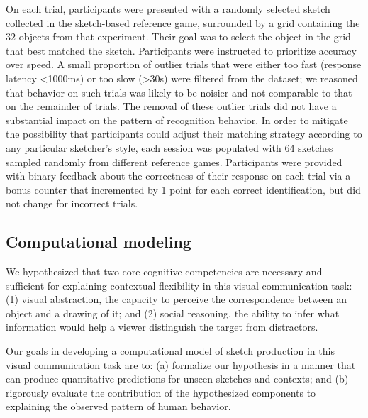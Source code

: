 \documentclass[9pt,twocolumn,twoside]{pnas-new}
\begin{document}
{On each trial, participants were presented with a randomly selected sketch collected in the sketch-based reference game, surrounded by a grid containing the 32 objects from that experiment. Their goal was to select the object in the grid that best matched the sketch. Participants were instructed to prioritize accuracy over speed. A small proportion of outlier trials that were either too fast (response latency <1000ms) or too slow (>30s) were filtered from the dataset; we reasoned that behavior on such trials was likely to be noisier and not comparable to that on the remainder of trials. The removal of these outlier trials did not have a substantial impact on the pattern of recognition behavior. In order to mitigate the possibility that participants could adjust their matching strategy according to any particular sketcher's style, each session was populated with 64 sketches sampled randomly from different reference games. Participants were provided with binary feedback about the correctness of their response on each trial via a bonus counter that incremented by 1 point for each correct identification, but did not change for incorrect trials.


\subsection*{Computational modeling}

We hypothesized that two core cognitive competencies are necessary and sufficient for explaining contextual flexibility in this visual communication task: (1) visual abstraction, the capacity to perceive the correspondence between an object and a drawing of it; and (2) social reasoning, the ability to infer what information would help a viewer distinguish the target from distractors.

Our goals in developing a computational model of sketch production in this visual communication task are to: (a) formalize our hypothesis in a manner that can produce quantitative predictions for unseen sketches and contexts; and (b) rigorously evaluate the contribution of the hypothesized components to explaining the observed pattern of human behavior.  

}
\end{document}
